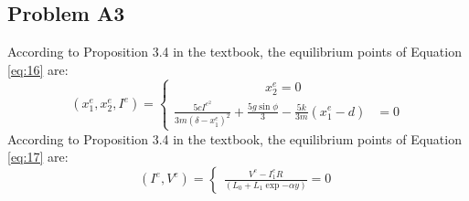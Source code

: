\subsection*{Problem A3} 
\hfill \break
According to Proposition 3.4 in the textbook, the equilibrium points of Equation \eqref{eq:16} are:
\hfill \break
\begin{equation}\label{eq:18}
(x_1^e, x_2^e, I^e) = 
    \begin{cases}
        \hspace{3cm}x_2^e = 0\\    
        \frac{5cI^e^2}{3m(\delta - x_1^e)^2} + \frac{5g\sin{\phi}}{3} - \frac{5k}{3m}(x_1^e -d) &= 0   
    \end{cases}
\end{equation}
\hfill \break
According to Proposition 3.4 in the textbook, the equilibrium points of Equation \eqref{eq:17} are:
\hfill \break
\begin{equation}\label{eq:19}
(I^e, V^e) = 
    \begin{cases}
        \frac{V^e - {I_1^e}R}{\left(L_{0} + L_{1}\exp{- \alpha y}\right)} = 0
    \end{cases}
\end{equation}